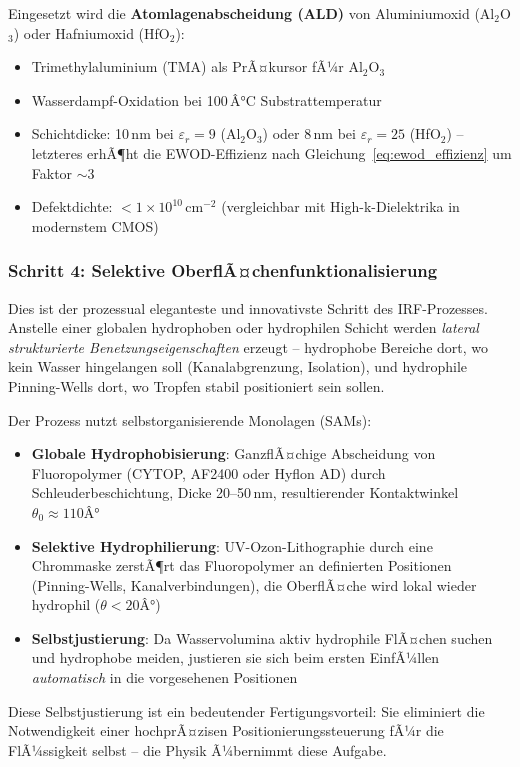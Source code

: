 ﻿\documentclass[a4paper,12pt]{scrreprt}
\theoremstyle{definition}
\begin{document}
Eingesetzt wird die \textbf{Atomlagenabscheidung (ALD)} von Aluminiumoxid
(Al$_2$O$_3$) oder Hafniumoxid (HfO$_2$):
\begin{itemize}
	\item Trimethylaluminium (TMA) als PrÃ¤kursor fÃ¼r Al$_2$O$_3$
	\item Wasserdampf-Oxidation bei 100\,Â°C Substrattemperatur
	\item Schichtdicke: 10\,nm bei $\varepsilon_r = 9$ (Al$_2$O$_3$)
	oder 8\,nm bei $\varepsilon_r = 25$ (HfO$_2$) -- letzteres
	erhÃ¶ht die EWOD-Effizienz nach Gleichung~\eqref{eq:ewod_effizienz}
	um Faktor $\sim$3
	\item Defektdichte: $< 1 \times 10^{10}$\,cm$^{-2}$ (vergleichbar
	mit High-k-Dielektrika in modernstem CMOS)
\end{itemize}

\subsubsection{Schritt 4: Selektive OberflÃ¤chenfunktionalisierung}

Dies ist der prozessual eleganteste und innovativste Schritt des IRF-Prozesses.
Anstelle einer globalen hydrophoben oder hydrophilen Schicht werden
\emph{lateral strukturierte Benetzungseigenschaften} erzeugt -- hydrophobe
Bereiche dort, wo kein Wasser hingelangen soll (Kanalabgrenzung, Isolation),
und hydrophile Pinning-Wells dort, wo Tropfen stabil positioniert sein sollen.

Der Prozess nutzt selbstorganisierende Monolagen (SAMs):
\begin{itemize}
	\item \textbf{Globale Hydrophobisierung}: GanzflÃ¤chige Abscheidung von
	Fluoropolymer (CYTOP, AF2400 oder Hyflon AD) durch Schleuderbeschichtung,
	Dicke 20--50\,nm, resultierender Kontaktwinkel $\theta_0 \approx 110Â°$
	\item \textbf{Selektive Hydrophilierung}: UV-Ozon-Lithographie durch eine
	Chrommaske zerstÃ¶rt das Fluoropolymer an definierten Positionen
	(Pinning-Wells, Kanalverbindungen), die OberflÃ¤che wird lokal
	wieder hydrophil ($\theta < 20Â°$)
	\item \textbf{Selbstjustierung}: Da Wasservolumina aktiv hydrophile
	FlÃ¤chen suchen und hydrophobe meiden, justieren sie sich beim
	ersten EinfÃ¼llen \emph{automatisch} in die vorgesehenen Positionen
\end{itemize}

Diese Selbstjustierung ist ein bedeutender Fertigungsvorteil: Sie eliminiert
die Notwendigkeit einer hochprÃ¤zisen Positionierungssteuerung fÃ¼r die
FlÃ¼ssigkeit selbst -- die Physik Ã¼bernimmt diese Aufgabe.
\end{document}
